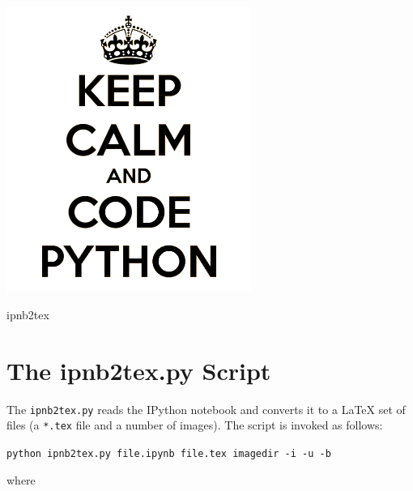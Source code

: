 \documentclass[english]{workpackage}[1996/06/02]
\begin{document}
\WPlayout


\ 
\vspace{50mm}
\begin{center}
\includegraphics[width=0.6\textwidth]{./images/keep-calm-and-code-python_BW.png}
\end{center}
\vspace{5mm}
\begin{center}
{\LARGE  ipnb2tex}
\end{center}

\newpage

\tableofcontents
\listoffigures
\listoftables
\lstlistoflistings



\chapter{The ipnb2tex.py Script}
\label{sec:Theipnb2texpyScript}


The \verb+ipnb2tex.py+ reads the IPython notebook and converts it to a \LaTeX{} set of files (a \verb+*.tex+ file and a number of images).  The script is invoked as follows:


\verb+python ipnb2tex.py file.ipynb file.tex imagedir -i -u -b+


where
\end{document}
